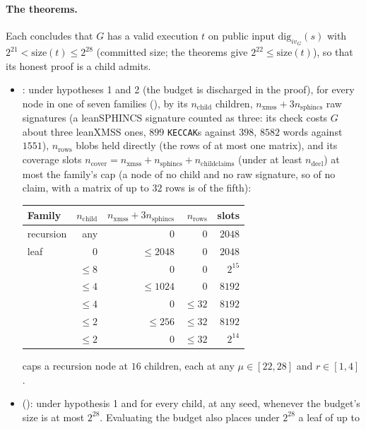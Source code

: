 \documentclass[11pt]{article}
\newcommand{\cnt}[1]{n_{\mathrm{#1}}}
\begin{document}
\paragraph{The theorems.} Each concludes that $G$ has a valid execution $t$ on public input
$\mathrm{dig}_{iv_G}(s)$ with $2^{21} < \mathrm{size}(t) \le 2^{28}$ (committed size; the
 theorems give $2^{22} \le \mathrm{size}(t)$), so that its honest proof is a child
 admits.
\begin{itemize}
\item {}: under hypotheses 1 and 2 (the budget is discharged in
the proof), for every node in one of seven families (), by its $\cnt{child}$
children, $\cnt{xmss} + 3\cnt{sphincs}$ raw signatures (a leanSPHINCS signature counted as three: its
check costs $G$ about three leanXMSS ones, $899$ \texttt{KECCAK}s against $398$, $8582$ words against $1551$), $\cnt{rows}$ blobs held directly (the rows of
at most one matrix), and its coverage slots $\cnt{cover} = \cnt{xmss} + \cnt{sphincs} +
\cnt{childclaims}$ (under  at least $\cnt{decl}$) at most the family's cap
(a node of no child and no raw signature, so of no claim, with a matrix of up to $32$ rows is of
the fifth):
\begin{center}\small
\begin{tabular}{lrrrr}
\toprule
Family & $\cnt{child}$ & $\cnt{xmss} + 3\cnt{sphincs}$ & $\cnt{rows}$ & slots\\\midrule
recursion & any & $0$ & $0$ & $2048$\\
leaf & $0$ & $\le 2048$ & $0$ & $2048$\\
& $\le 8$ & $0$ & $0$ & $2^{15}$\\
& $\le 4$ & $\le 1024$ & $0$ & $8192$\\
& $\le 4$ & $0$ & $\le 32$ & $8192$\\
& $\le 2$ & $\le 256$ & $\le 32$ & $8192$\\
& $\le 2$ & $0$ & $\le 32$ & $2^{14}$\\
\bottomrule
\end{tabular}
\end{center}
 caps a recursion node at $16$ children, each at
any $\mu \in [22,28]$ and $r \in [1,4]$.
\item {} (): under hypothesis 1 and 
for every child, at any seed, whenever the budget's size is at most $2^{28}$. Evaluating the budget also places under $2^{28}$ a leaf of up to

\end{itemize}
\end{document}
